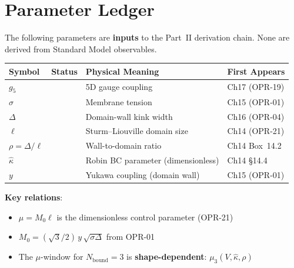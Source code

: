 
\section{Parameter Ledger}
\label{sec:ch20_parameter_ledger}

\begin{tcolorbox}[colback=blue!5!white, colframe=blue!50!black,
    title=\textbf{Primitive Inputs: What Enters the Framework}]

The following parameters are \textbf{inputs} to the Part~II derivation chain.
None are derived from Standard Model observables.

\medskip
\begin{center}
\renewcommand{\arraystretch}{1.4}
\begin{tabular}{llp{4cm}l}
\toprule
\textbf{Symbol} & \textbf{Status} & \textbf{Physical Meaning} & \textbf{First Appears} \\
\midrule
$g_5$ & \tagP{} & 5D gauge coupling & Ch17 (OPR-19) \\
$\sigma$ & \tagP{} & Membrane tension & Ch15 (OPR-01) \\
$\Delta$ & \tagP{} & Domain-wall kink width & Ch16 (OPR-04) \\
$\ell$ & \tagP{} & Sturm--Liouville domain size & Ch14 (OPR-21) \\
$\rho = \Delta/\ell$ & \tagP{} & Wall-to-domain ratio & Ch14 Box~14.2 \\
$\hat\kappa$ & \tagP{} & Robin BC parameter (dimensionless) & Ch14 \S14.4 \\
$y$ & \tagP{} & Yukawa coupling (domain wall) & Ch15 (OPR-01) \\
\bottomrule
\end{tabular}
\end{center}

\medskip
\textbf{Key relations}:
\begin{itemize}[nosep]
    \item $\mu = M_0 \ell$ is the dimensionless control parameter (OPR-21)
    \item $M_0 = (\sqrt{3}/2)\, y\, \sqrt{\sigma\Delta}$ from OPR-01 \tagDc{}
    \item The $\mu$-window for $N_{\text{bound}} = 3$ is \textbf{shape-dependent}: $\mu_3(V, \hat\kappa, \rho)$
\end{itemize}

\end{tcolorbox}


